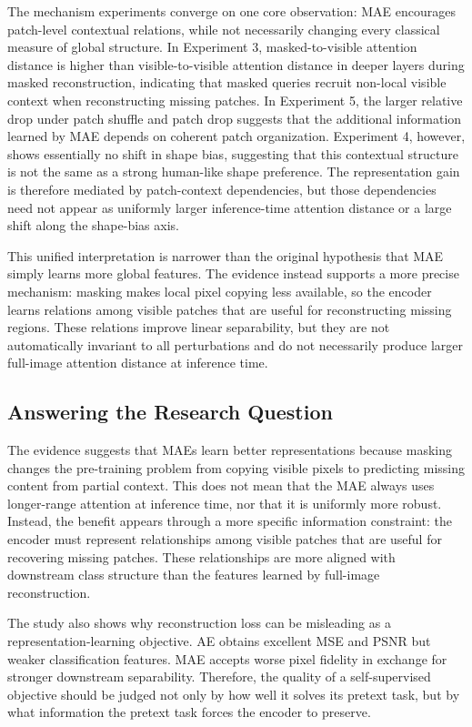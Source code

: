 \documentclass[10pt,twocolumn,letterpaper]{article}
\begin{document}
The mechanism experiments converge on one core observation: MAE encourages patch-level contextual relations, while not necessarily changing every classical measure of global structure. In Experiment 3, masked-to-visible attention distance is higher than visible-to-visible attention distance in deeper layers during masked reconstruction, indicating that masked queries recruit non-local visible context when reconstructing missing patches. In Experiment 5, the larger relative drop under patch shuffle and patch drop suggests that the additional information learned by MAE depends on coherent patch organization. Experiment 4, however, shows essentially no shift in shape bias, suggesting that this contextual structure is not the same as a strong human-like shape preference. The representation gain is therefore mediated by patch-context dependencies, but those dependencies need not appear as uniformly larger inference-time attention distance or a large shift along the shape-bias axis.

This unified interpretation is narrower than the original hypothesis that MAE simply learns more global features. The evidence instead supports a more precise mechanism: masking makes local pixel copying less available, so the encoder learns relations among visible patches that are useful for reconstructing missing regions. These relations improve linear separability, but they are not automatically invariant to all perturbations and do not necessarily produce larger full-image attention distance at inference time.

\subsection{Answering the Research Question}

The evidence suggests that MAEs learn better representations because masking changes the pre-training problem from copying visible pixels to predicting missing content from partial context. This does not mean that the MAE always uses longer-range attention at inference time, nor that it is uniformly more robust. Instead, the benefit appears through a more specific information constraint: the encoder must represent relationships among visible patches that are useful for recovering missing patches. These relationships are more aligned with downstream class structure than the features learned by full-image reconstruction.

The study also shows why reconstruction loss can be misleading as a representation-learning objective. AE obtains excellent MSE and PSNR but weaker classification features. MAE accepts worse pixel fidelity in exchange for stronger downstream separability. Therefore, the quality of a self-supervised objective should be judged not only by how well it solves its pretext task, but by what information the pretext task forces the encoder to preserve.
\end{document}
